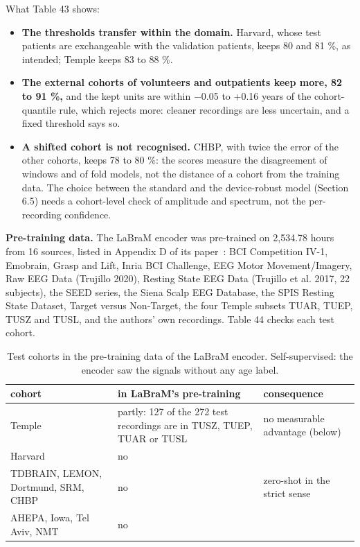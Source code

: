 \documentclass[11pt,a4paper]{article}
\begin{document}
What Table 43 shows:

\begin{itemize}
\item \textbf{The thresholds transfer within the domain.} Harvard, whose test patients are exchangeable with the validation patients, keeps 80 and 81 \%, as intended; Temple keeps 83 to 88 \%.
\item \textbf{The external cohorts of volunteers and outpatients keep more, 82 to 91 \%,} and the kept units are within $-$0.05 to +0.16 years of the cohort-quantile rule, which rejects more: cleaner recordings are less uncertain, and a fixed threshold says so.
\item \textbf{A shifted cohort is not recognised.} CHBP, with twice the error of the other cohorts, keeps 78 to 80 \%: the scores measure the disagreement of windows and of fold models, not the distance of a cohort from the training data. The choice between the standard and the device-robust model (Section 6.5) needs a cohort-level check of amplitude and spectrum, not the per-recording confidence.
\end{itemize}

\textbf{Pre-training data.} The LaBraM encoder was pre-trained on 2,534.78 hours from 16 sources, listed in Appendix D of its paper~\citep{jiang2024labram}: BCI Competition IV-1, Emobrain, Grasp and Lift, Inria BCI Challenge, EEG Motor Movement/Imagery, Raw EEG Data (Trujillo 2020), Resting State EEG Data (Trujillo et al. 2017, 22 subjects), the SEED series, the Siena Scalp EEG Database, the SPIS Resting State Dataset, Target versus Non-Target, the four Temple subsets TUAR, TUEP, TUSZ and TUSL, and the authors' own recordings. Table 44 checks each test cohort.

\begin{table}[t]
\centering
\small
\caption{Test cohorts in the pre-training data of the LaBraM encoder. Self-supervised: the encoder saw the signals without any age label.}
\begin{tabular}{lll}
\toprule
\textbf{cohort} & \textbf{in LaBraM's pre-training} & \textbf{consequence} \\
\midrule
Temple & partly: 127 of the 272 test recordings are in TUSZ, TUEP, TUAR or TUSL & no measurable advantage (below) \\
Harvard & no &  \\
TDBRAIN, LEMON, Dortmund, SRM, CHBP & no & zero-shot in the strict sense \\
AHEPA, Iowa, Tel Aviv, NMT & no &  \\
\bottomrule
\end{tabular}
\end{table}
\end{document}
